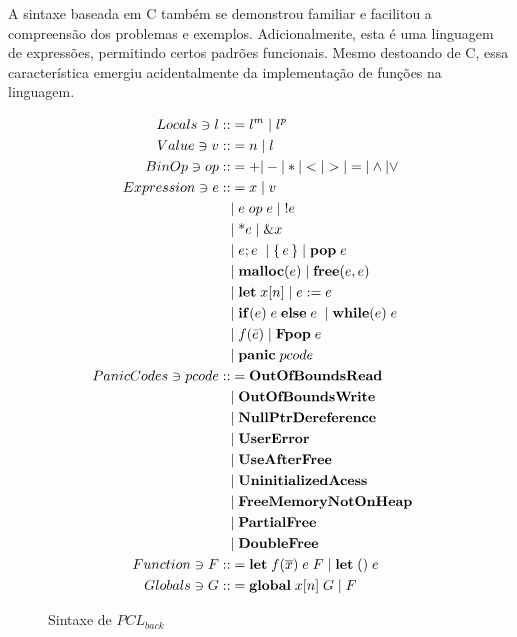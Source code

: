 A sintaxe baseada em C também se demonstrou familiar e facilitou a compreensão dos problemas e exemplos. Adicionalmente, esta é uma linguagem de expressões, permitindo certos padrões funcionais. Mesmo destoando de C, essa característica emergiu acidentalmente da implementação de funções na linguagem. 
\begin{figure*}[ht]
	\caption{Sintaxe de $PCL_{back}$}
	\label{fig:pclback:sintax}
	\begingroup
		\begin{align*}
			Locals \ni l ::&= l^m \;|\; l^p &&\\ 
			Value \ni v ::&= n \;|\; l && \\
			BinOp \ni op ::&= + | - | * | < | > | = | \land | \lor \\
			Expression \ni e ::&= x \;|\; v \\
			&|\; e\; op\; e \;|\; !e  \\
			&|\; \text{*}e \;|\; \&x \\
			&|\; e;e \; \;|\; \{\,e\,\} \;|\; \mathbf{pop}\;e\; \\ 
			&|\; \mathbf{malloc}(e) \;|\; \mathbf{free}(e, e) \; \\ 
			&|\; \mathbf{let}\; x[n] \;|\; e := e \; \\
			&|\; \mathbf{if}(e) \; e \; \mathbf{else} \; e \; \;|\; \mathbf{while}(e) \; e \\
			&|\; f(\bar e) \;|\; \mathbf{Fpop}\;e\\ 
			&|\; \mathbf{panic}\;pcode \\ 
			PanicCodes \ni pcode ::&= \mathbf{OutOfBoundsRead}\\
			&|\; \mathbf{OutOfBoundsWrite}\\
			&|\; \mathbf{NullPtrDereference}\\
			&|\; \mathbf{UserError}\\
			&|\; \mathbf{UseAfterFree}\\
			&|\; \mathbf{UninitializedAcess}\\
			&|\; \mathbf{FreeMemoryNotOnHeap}\\
			&|\; \mathbf{PartialFree}\\
			&|\; \mathbf{DoubleFree}\\
			Function \ni F ::&= \mathbf{let} \; f(\overline{x})\; e \; F \; | \; \mathbf{let}\;() \; e \\
			Globals \ni G ::&= \mathbf{global}\; x[n] \;G \;|\; F
		\end{align*}
	\endgroup
\end{figure*}
\FloatBarrier

